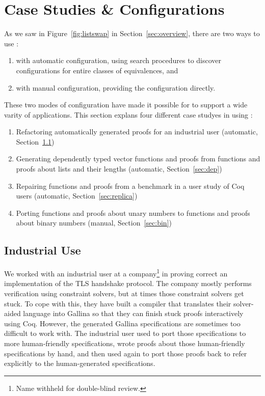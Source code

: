 \section{Case Studies \& Configurations}
\label{sec:search}

As we saw in Figure~\ref{fig:listswap} in Section~\ref{sec:overview},
there are two ways to use \toolname:

\begin{enumerate}
\item with automatic configuration, using search procedures to discover configurations for entire classes of equivalences, and
\item with manual configuration, providing the configuration directly.
\end{enumerate}
These two modes of configuration have made it possible for \toolname to support a wide
varity of applications.
This section explans four different case studyes in using \toolname:

\begin{enumerate}
\item Refactoring automatically generated proofs for an industrial user (automatic, Section~\ref{sec:industry})
\item Generating dependently typed vector functions and proofs from functions and proofs about lists and their lengths (automatic, Section~\ref{sec:dep})
\item Repairing functions and proofs from a benchmark in a user study of Coq users (automatic, Section~\ref{sec:replica})
\item Porting functions and proofs about unary numbers to functions and proofs about binary numbers (manual, Section~\ref{sec:bin})
\end{enumerate}


\subsection{Industrial Use}
\label{sec:industry}

We worked with an industrial user at a company\footnote{Name withheld for double-blind review.} in proving
correct an implementation of the TLS handshake protocol.
The company mostly performs verification using constraint solvers, but at times those constraint solvers
get stuck.
To cope with this, they have built a compiler that translates their solver-aided language into Gallina
so that they can finish stuck proofs interactively using Coq.
However, the generated Gallina specifications are sometimes too difficult to work with.
The industrial user used \toolname to port those specifications to more human-friendly specifications,
wrote proofs about those human-friendly specifications by hand, and then used \toolname again
to port those proofs back to refer explicitly to the human-generated specifications.

